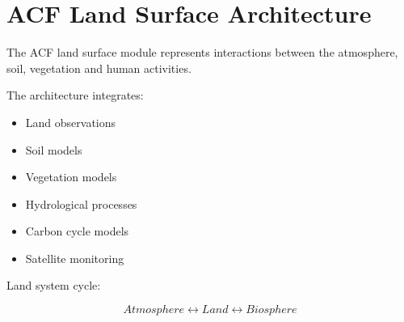\section{ACF Land Surface Architecture}


The ACF land surface module represents interactions between
the atmosphere, soil, vegetation and human activities.



The architecture integrates:


\begin{itemize}

\item Land observations

\item Soil models

\item Vegetation models

\item Hydrological processes

\item Carbon cycle models

\item Satellite monitoring

\end{itemize}



Land system cycle:


\begin{equation}
Atmosphere
\leftrightarrow
Land
\leftrightarrow
Biosphere
\end{equation}
